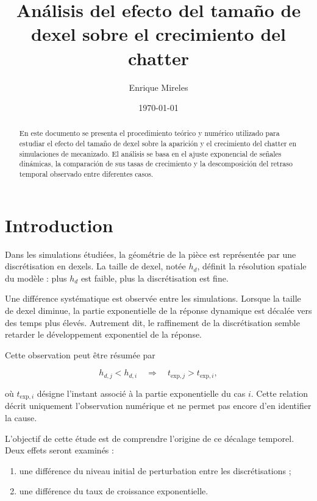 \documentclass[
    11pt,
    a4paper
]{article}
\title{
    \textbf{Análisis del efecto del tamaño de dexel sobre el crecimiento del chatter}
}
\author{
    Enrique Mireles
}
\date{\today}
\begin{document}
\maketitle

\begin{abstract}

En este documento se presenta el procedimiento teórico y numérico utilizado
para estudiar el efecto del tamaño de dexel sobre la aparición y el crecimiento
del chatter en simulaciones de mecanizado. El análisis se basa en el ajuste
exponencial de señales dinámicas, la comparación de sus tasas de crecimiento
y la descomposición del retraso temporal observado entre diferentes casos.

\end{abstract}

\tableofcontents

\newpage


\section{Introduction}
\label{sec:introduction}

Dans les simulations étudiées, la géométrie de la pièce est représentée par une
discrétisation en dexels. La taille de dexel, notée \(h_d\), définit la résolution
spatiale du modèle : plus \(h_d\) est faible, plus la discrétisation est fine.

Une différence systématique est observée entre les simulations. Lorsque la taille
de dexel diminue, la partie exponentielle de la réponse dynamique est décalée vers
des temps plus élevés. Autrement dit, le raffinement de la discrétisation semble
retarder le développement exponentiel de la réponse.

Cette observation peut être résumée par

\begin{equation}
    h_{d,j} < h_{d,i}
    \quad\Longrightarrow\quad
    t_{\mathrm{exp},j} > t_{\mathrm{exp},i},
    \label{eq:observation_dexel}
\end{equation}

où \(t_{\mathrm{exp},i}\) désigne l'instant associé à la partie exponentielle du
cas \(i\). Cette relation décrit uniquement l'observation numérique et ne permet
pas encore d'en identifier la cause.

L'objectif de cette étude est de comprendre l'origine de ce décalage temporel.
Deux effets seront examinés :

\begin{enumerate}
    \item une différence du niveau initial de perturbation entre les
    discrétisations ;
    \item une différence du taux de croissance exponentielle.
\end{enumerate}
\end{document}
